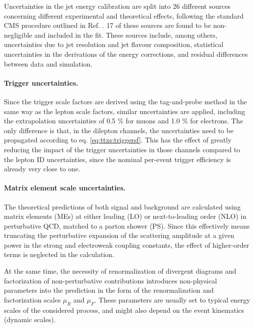 Uncertainties in the jet energy calibration are split into 26 different sources concerning different experimental and theoretical effects, following the standard CMS procedure outlined in Ref. \cite{CMS:JME-13-004}. 17 of these sources are found to be non-negligible and included in the fit. These sources include, among others, uncertainties due to jet \pt resolution and jet flavour composition, statistical uncertainties in the derivations of the energy corrections, and residual differences between data and simulation.

\paragraph{Trigger uncertainties.}

Since the trigger scale factors are derived using the tag-and-probe method in the same way as the lepton scale factors, similar uncertainties are applied, including the extrapolation uncertainties of 0.5 \% for muons and 1.0 \% for electrons. The only difference is that, in the dilepton channels, the uncertainties need to be propagated according to eq. \ref{eq:ttxs:triggersf}. This has the effect of greatly reducing the impact of the trigger uncertainties in those channels compared to the lepton ID uncertainties, since the nominal per-event trigger efficiency is already very close to one.

\paragraph{Matrix element scale uncertainties.}

The theoretical predictions of both signal and background are calculated using matrix elements (MEs) at either leading (LO) or next-to-leading order (NLO) in perturbative QCD, matched to a parton shower (PS). Since this effectively means truncating the perturbative expansion of the scattering amplitude at a given power in the strong and electroweak coupling constants, the effect of higher-order terms is neglected in the calculation.

At the same time, the necessity of renormalization of divergent diagrams and factorization of non-perturbative contributions introduces non-physical parameters into the prediction in the form of the renormalization and factorization scales $\mu_R$ and $\mu_F$. These parameters are usually set to typical energy scales of the considered process, and might also depend on the event kinematics (dynamic scales).

